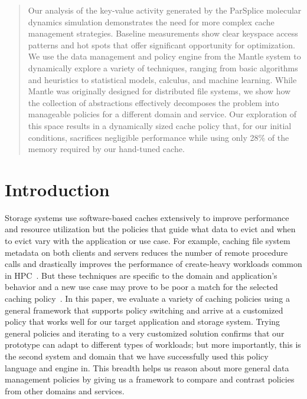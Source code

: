 \begin{abstract}

Our analysis of the key-value activity generated by the ParSplice molecular
dynamics simulation demonstrates the need for more complex cache management
strategies. Baseline measurements show clear keyspace access patterns and hot
spots that offer significant opportunity for optimization. We use the data
management and policy engine from the Mantle system to dynamically explore a
variety of techniques, ranging from basic algorithms and heuristics to
statistical models, calculus, and machine learning. While Mantle was originally
designed for distributed file systems, we show how the collection of
abstractions effectively decomposes the problem into manageable policies for a
different domain and service.  Our exploration of this space results in a
dynamically sized cache policy that, for our initial conditions, sacrifices
negligible performance while using only 28\% of the memory required by our
hand-tuned cache.

\end{abstract}

\section{Introduction}

Storage systems use software-based caches extensively to improve performance
and resource utilization but the policies that guide what data to evict and
when to evict vary with the application or use case. For example, caching file
system metadata on both clients and servers reduces the number of remote
procedure calls and drastically improves the performance of create-heavy
workloads common in HPC~\cite{ren:sc2014-indexfs, patil:fast2011-giga+}. But
these techniques are specific to the domain and application's behavior and a
new use case may prove to be poor a match for the selected caching
policy~\cite{xiao:socc15-shardfs,brandt:msst2003-lh,sevilla:sc15-mantle,
weil:sc2004-dyn-metadata, weil:osdi2006-ceph}. In this paper, we evaluate a
variety of caching policies using a general framework that supports policy
switching and arrive at a customized policy that works well for our target
application and storage system.  Trying general policies and iterating to a
very customized solution confirms that our prototype can adapt to different
types of workloads; but more importantly, this is the second system and domain
that we have successfully used this policy language and engine in. This breadth
helps us reason about more general data management policies by giving us a
framework to compare and contrast policies from other domains and services.

